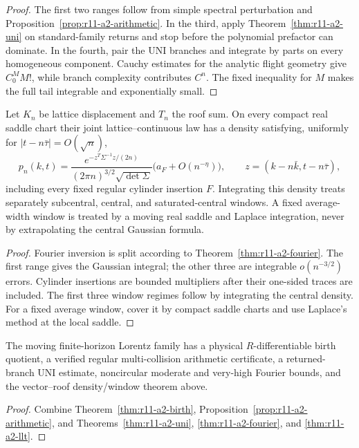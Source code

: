 \begin{proof}
The first two ranges follow from simple spectral perturbation and
Proposition~\ref{prop:r11-a2-arithmetic}.  In the third, apply
Theorem~\ref{thm:r11-a2-uni} on standard-family returns and stop before the
polynomial prefactor can dominate.  In the fourth, pair the UNI branches and
integrate by parts on every homogeneous component.  Cauchy estimates for the
analytic flight geometry give $C_0^MM!$, while branch complexity contributes
$C^n$.  The fixed inequality for $M$ makes the full tail integrable and
exponentially small.
\end{proof}

\begin{theorem}
\label{thm:r11-a2-llt}
Let $K_n$ be lattice displacement and $T_n$ the roof sum.  On every compact
real saddle chart their joint lattice--continuous law has a density satisfying,
uniformly for $|t-n\bar\tau|=O(\sqrt n)$,
\[
 p_n(k,t)=\frac{e^{-z^T\Sigma^{-1}z/(2n)}}
 {(2\pi n)^{3/2}\sqrt{\det\Sigma}}
 \bigl(a_F+O(n^{-\eta})\bigr),
 \qquad z=(k-n\bar k,t-n\bar\tau),
\]
including every fixed regular cylinder insertion $F$.  Integrating this
density treats separately subcentral, central, and saturated-central windows.
A fixed average-width window is treated by a moving real saddle and Laplace
integration, never by extrapolating the central Gaussian formula.
\end{theorem}

\begin{proof}
Fourier inversion is split according to
Theorem~\ref{thm:r11-a2-fourier}.  The first range gives the Gaussian integral;
the other three are integrable $o(n^{-3/2})$ errors.  Cylinder insertions are
bounded multipliers after their one-sided traces are included.  The first
three window regimes follow by integrating the central density.  For a fixed
average window, cover it by compact saddle charts and use Laplace's method at
the local saddle.
\end{proof}

\begin{theorem}
\label{thm:r11-a2-main}
The moving finite-horizon Lorentz family has a physical $R$-differentiable
birth quotient, a verified regular multi-collision arithmetic certificate, a
returned-branch UNI estimate, noncircular moderate and very-high Fourier
bounds, and the vector--roof density/window theorem above.
\end{theorem}

\begin{proof}
Combine Theorem~\ref{thm:r11-a2-birth},
Proposition~\ref{prop:r11-a2-arithmetic}, and
Theorems~\ref{thm:r11-a2-uni}, \ref{thm:r11-a2-fourier}, and
\ref{thm:r11-a2-llt}.
\end{proof}
